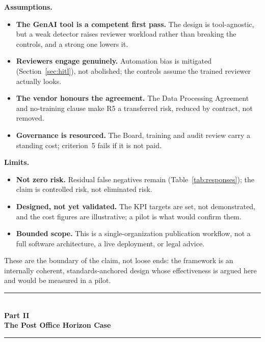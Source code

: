 \documentclass[12pt,a4paper]{article}
\begin{document}
\begin{definitionbox}[]
\textbf{Assumptions.}
\begin{itemize}
  \item \textbf{The GenAI tool is a competent first pass.} The design is tool-agnostic, but a weak detector raises reviewer workload rather than breaking the controls, and a strong one lowers it.
  \item \textbf{Reviewers engage genuinely.} Automation bias is mitigated (Section~\ref{sec:hitl}), not abolished; the controls assume the trained reviewer actually looks.
  \item \textbf{The vendor honours the agreement.} The Data Processing Agreement and no-training clause make R5 a transferred risk, reduced by contract, not removed.
  \item \textbf{Governance is resourced.} The Board, training and audit review carry a standing cost; criterion~5 fails if it is not paid.
\end{itemize}
\textbf{Limits.}
\begin{itemize}
  \item \textbf{Not zero risk.} Residual false negatives remain (Table~\ref{tab:responses}); the claim is controlled risk, not eliminated risk.
  \item \textbf{Designed, not yet validated.} The KPI targets are set, not demonstrated, and the cost figures are illustrative; a pilot is what would confirm them.
  \item \textbf{Bounded scope.} This is a single-organization publication workflow, not a full software architecture, a live deployment, or legal advice.
\end{itemize}
\end{definitionbox}

These are the boundary of the claim, not loose ends: the framework is an internally coherent, standards-anchored design whose effectiveness is argued here and would be measured in a pilot.



\clearpage
\begin{center}
{\color{accentdark}\rule{\textwidth}{1.2pt}}\\[6pt]
{\Huge\bfseries\color{accentdark} Part II}\\[8pt]
{\LARGE\bfseries\color{accentdark!85!black} The Post Office Horizon Case}\\[8pt]
{\color{accentdark}\rule{\textwidth}{1.2pt}}
\end{center}
\vspace{8pt}
\end{document}
